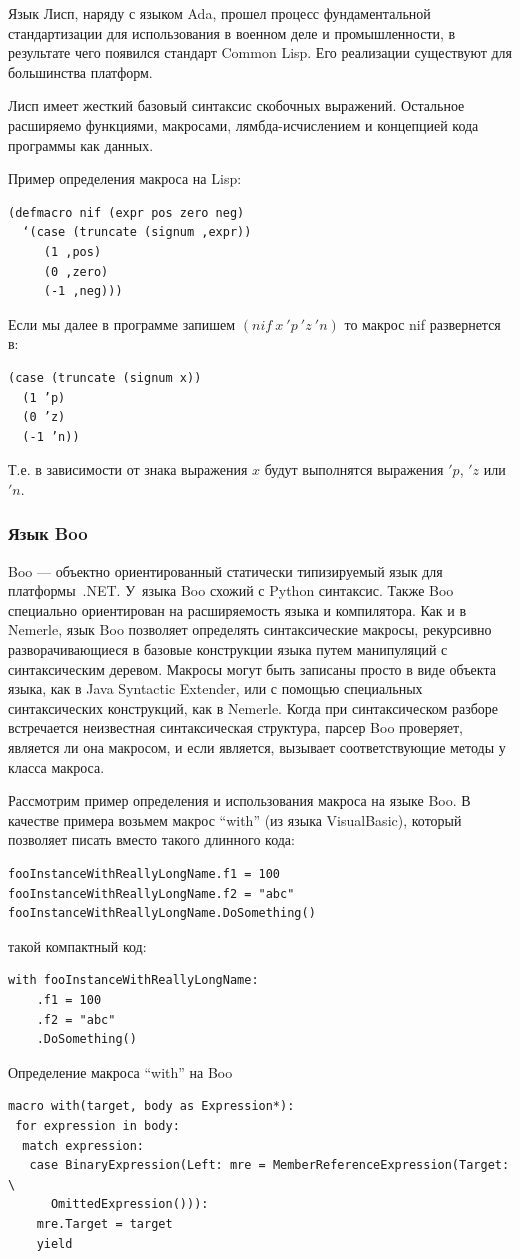 \documentclass[a4paper,12pt,titlepage]{extarticle}
\begin{document}
Язык Лисп, наряду с языком Ada, прошел процесс фундаментальной стандартизации
для использования в военном деле и промышленности, в результате чего появился
стандарт Common Lisp. Его реализации существуют для большинства платформ.

Лисп имеет жесткий базовый синтаксис скобочных выражений. Остальное расширяемо
функциями, макросами, лямбда-исчислением и концепцией кода программы как
данных.

Пример определения макроса на Lisp:
\begin{verbatim}
(defmacro nif (expr pos zero neg)
  ‘(case (truncate (signum ,expr))
     (1 ,pos)
     (0 ,zero)
     (-1 ,neg)))
\end{verbatim}
Если мы далее в программе запишем $(nif ~ x ~ 'p ~ 'z ~ 'n)$ то макрос nif
развернется в:
\begin{verbatim}
(case (truncate (signum x))
  (1 ’p)
  (0 ’z)
  (-1 ’n))
\end{verbatim}
Т.е. в зависимости от знака выражения $x$ будут выполнятся выражения $'p$, $'z$
или $'n$.

\subsubsection*{Язык Boo}
Boo --- объектно ориентированный статически типизируемый язык для платформы~.NET.
У~языка Boo схожий с Python синтаксис. Также Boo специально ориентирован на
расширяемость языка и компилятора. Как и в Nemerle, язык Boo позволяет
определять синтаксические макросы, рекурсивно разворачивающиеся в базовые
конструкции языка путем манипуляций с синтаксическим деревом. Макросы могут
быть записаны просто в виде объекта языка, как в Java Syntactic Extender, или с
помощью специальных синтаксических конструкций, как в Nemerle. Когда при
синтаксическом разборе встречается неизвестная синтаксическая структура, парсер
Boo проверяет, является ли она макросом, и если является, вызывает
соответствующие методы у класса макроса.

Рассмотрим пример определения и использования макроса на языке Boo. В качестве
примера возьмем макрос ``with'' (из языка VisualBasic), который позволяет писать
вместо такого длинного кода:
\begin{verbatim}
fooInstanceWithReallyLongName.f1 = 100
fooInstanceWithReallyLongName.f2 = "abc"
fooInstanceWithReallyLongName.DoSomething()
\end{verbatim}
такой компактный код:
\begin{verbatim}
with fooInstanceWithReallyLongName:
    .f1 = 100
    .f2 = "abc"
    .DoSomething()
\end{verbatim}
Определение макроса ``with'' на Boo
\begin{verbatim}
macro with(target, body as Expression*):
 for expression in body:
  match expression:
   case BinaryExpression(Left: mre = MemberReferenceExpression(Target: \ 
      OmittedExpression())):
    mre.Target = target
    yield
\end{verbatim}
\end{document}
